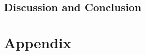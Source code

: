 \documentclass[11pt,a4paper,bibtotoc,idxtotoc,headsepline,footsepline,footexclude,BCOR12mm,DIV13]{scrbook}
\begin{document}
\chapter{Discussion and Conclusion}


		
		\part*{Appendix}
		
		\appendix %
		

  \clearemptydoublepage
  
	
	
 
\end{document}
